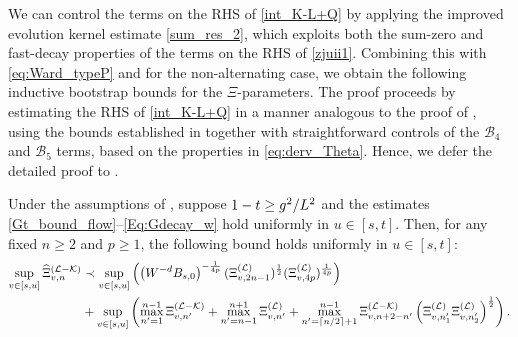 We can control the terms on the RHS of \eqref{int_K-L+Q} by applying the improved evolution kernel estimate \eqref{sum_res_2}, which exploits both the sum-zero and fast-decay properties of the terms on the RHS of \eqref{zjuii1}. Combining this with \eqref{eq:Ward_typeP} and  for the non-alternating case, we obtain the following inductive bootstrap bounds for the $\Xi$-parameters. The proof proceeds by estimating the RHS of \eqref{int_K-L+Q} %
in a manner analogous to the proof of , using the bounds established in  together with straightforward controls of the $\mathcal{B}_4$ and $\mathcal{B}_5$ terms, based on the properties in \eqref{eq:derv_Theta}. Hence, we defer the detailed proof to .


\begin{lemma}
\label{lem:STOeq_Qt} 
Under the assumptions of , suppose $1-t\ge g^2/L^{2}$ and the estimates \eqref{Gt_bound_flow}--\eqref{Eq:Gdecay_w} hold uniformly in $u\in[s,t]$. Then, for any fixed $n\ge 2$ and $p\ge 1$, the following bound holds uniformly in $u\in[s,t]$: 
\begin{align}\label{am;asoi222}
\sup_{v\in[s,u]} \widehat\Xi^{({\mathcal L-\mathcal K})}_{v,n} &\prec \sup_{v\in[s,u]} \left(\left({W^{-d}B_{s,0}}\right)^{-\frac{1}{4p}}(\Xi^{(\mathcal L)}_{v, {2n-1}})^{\frac 1 2}(\Xi^{(\mathcal L)}_{v, 4p})^{\frac{1}{4p}}\right)\\
&+ \sup_{v\in[s,u]} \left(\max_{n'=1}^{n-1} \Xi^{({\mathcal L-\mathcal K})}_{v,n'}+ \max_{n'=n-1}^{n+1} \Xi^{({\mathcal L})}_{v,n'} + \max_{n'=\lceil n/2\rceil + 1}^{n-1} \Xi^{({\mathcal L-\mathcal K})}_{v,n+2-n'} \left({\Xi^{({\mathcal L})}_{v,n_1'} \Xi^{({\mathcal L})}_{v,n_2'}}\right)^{\frac 12 } \right).\nonumber
\end{align}

\end{lemma}

